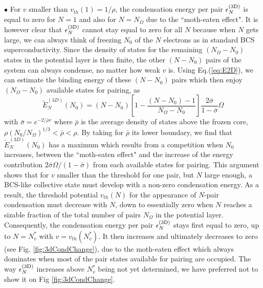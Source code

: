 \documentclass[5p,twocolumn]{elsarticle}
\begin{document}
$\bullet$ For $v$ smaller than $v_{th}(1)=1/\rho$, the condensation energy per pair $\epsilon_N^{{\text{(3D)}}}$ is equal to zero for $N=1$ and also for $N=N_\Omega$ due to the ``moth-eaten effect".  It is however clear that $\epsilon_N^{{\text{(3D)}}}$ cannot stay equal to zero for all $N$ because when $N$ gets large, we can always think of freezing $N_0$ of the $N$ electrons as in standard BCS superconductivity. Since the density of states for the remaining $(N_\Omega - N_0)$ states in the potential layer is then finite, the other $(N-N_0)$ pairs of the system can always condense, no matter how weak $v$ is.  Using Eq.(\ref{eq:E2D}),
 we can estimate the binding energy of these $(N-N_0)$ pairs which then enjoy $(N_\Omega - N_0)$ available states for pairing, as
\begin{equation}\label{eq:E3D}
\widetilde{{E}}_N^{(3D)}(N_0)=(N-N_0)\left[1-\frac{(N-N_0)-1}{N_\Omega-N_0}\right]\frac{2\bar\sigma}{1-\bar\sigma}\Omega
\end{equation}
with $\bar{\sigma}=e^{-2/{\bar{\rho}v}}$ where $\bar\rho$ is the average density of states above the frozen core, $\rho(N_0/N_\Omega)^{ 1/3}<\bar\rho<\rho$. By taking for  $\bar\rho$ its lower boundary, we find that $\widetilde{{E}}_N^{(3D)}(N_0)$ has a maximum which results from a competition when $N_0$ increases, between the ``moth-eaten effect" and the increase of the energy contribution $2\bar\sigma\Omega/(1-\bar\sigma)$  from each available states for pairing.
This argument shows that for $v$ smaller than the threshold for one pair, but $N$ large enough, a BCS-like collective state must develop with a non-zero condensation energy. 
As a result, the threshold potential  $v_{th}(N)$ for the appearance of $N$-pair condensation  must decrease with $N$, down to essentially zero when $N$ reaches a sizable fraction of the total number of pairs $N_\Omega$ in the potential layer.  Consequently, the condensation energy per pair $\epsilon^{{{\text{(3D)}}}}_{N}$ stays first equal to zero, up to $N=N_v^*$ with $v=v_{th}(N_v^*)$. It then increases and ultimately decreases to zero (see Fig. \ref{fig:3dCondChange}), due to the moth-eaten effect which always dominates when most of the pair states available for pairing are occupied.  The way $\epsilon_{N}^{{{\text{(3D)}}}}$ increases above $N_{v}^{*}$ being not yet determined, we have preferred not to show it on Fig \ref{fig:3dCondChange}. 
\end{document}
